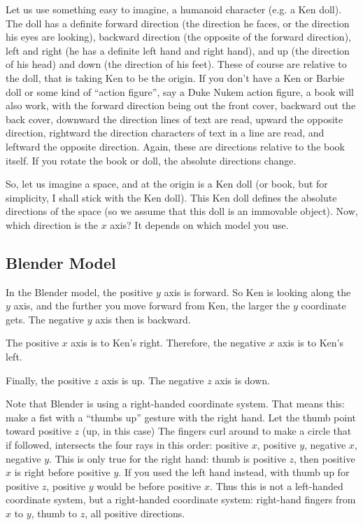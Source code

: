 \documentclass[letter,12pt]{article}
\begin{document}
Let us use something easy to imagine, a humanoid character (e.g. a Ken doll). The doll has a definite forward direction (the direction he faces, or the direction his eyes are looking), backward direction (the opposite of the forward direction), left and right (he has a definite left hand and right hand), and up (the direction of his head) and down (the direction of his feet).  These of course are relative to the doll, that is taking Ken to be the origin.    If you don’t have a Ken or Barbie doll or some kind of “action figure”, say a Duke Nukem action figure, a book will also work, with the  forward direction being out the front cover, backward out the back cover, downward the direction lines of text are read, upward the opposite direction, rightward the direction characters of text in a line are read, and leftward the opposite direction.  Again, these are directions relative to the book itself.  If you rotate the book or doll, the absolute directions change.


So, let us imagine a space, and at the origin is a Ken doll (or book, but for simplicity, I shall stick with the Ken doll).  This Ken doll defines the absolute directions of the space (so we assume that this doll is an immovable object).  Now, which direction is the $x$ axis? It depends on which model you use.  


\subsection{Blender Model}

In the Blender model, the positive $y$ axis is forward.  So Ken is looking along the $y$ axis, and the further you move forward from Ken, the larger the $y$ coordinate gets.  The negative $y$ axis then is backward.

The positive $x$ axis is to Ken’s right.  Therefore, the negative $x$ axis is to Ken’s left.

Finally, the positive $z$ axis is up.  The negative $z$ axis is down.

Note that Blender is using a right-handed coordinate system.  That means this: make a fist with a “thumbs up” gesture with the right hand.  Let the thumb point toward positive $z$ (up, in this case) The fingers curl around to make a circle that if followed, intersects the four rays in this order: positive $x$, positive $y$, negative $x$, negative $y$.   This is only true for the right hand: thumb is positive $z$, then positive $x$ is right before positive $y$.  If you used the left hand instead, with thumb up for positive $z$, positive $y$ would be before positive $x$.  Thus this is not a left-handed coordinate system, but a right-handed coordinate system: right-hand fingers from $x$ to $y$, thumb to $z$, all positive directions.
\end{document}
